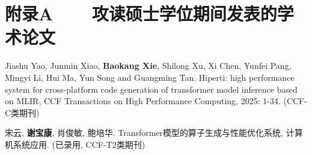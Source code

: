 \chapter*{附录A~~~~攻读硕士学位期间发表的学术论文}
\setlength{\parindent}{0em}
\begin{publist}
	\item Jiashu Yao, Junmin Xiao, \textbf{Baokang Xie}, Shilong Xu, Xi Chen, Yunfei Pang, Mingyi Li, Hui Ma, Yun Song and Guangming Tan. Hiperti: high performance system for cross-platform code generation of transformer model inference based on MLIR, CCF Transactions on High Performance Computing, 2025: 1-34. (CCF-C类期刊)
	\item	宋云, \textbf{谢宝康}, 肖俊敏, 鲍培华. Transformer模型的算子生成与性能优化系统, 计算机系统应用. (已录用, CCF-T2类期刊)
\end{publist}

